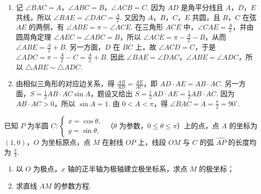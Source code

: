 \begin{solution}
\begin{enumerate}
\item 记 \(\angle BAC=A\)，\(\angle ABC=B\)，\(\angle ACB=C\). 因为 \(AD\) 是角平分线且 \(A\)，\(D\)，\(E\) 共线，所以 \(\angle BAE=\angle DAC=\frac{A}{2}\). 又因为 \(A\)，\(B\)，\(C\)，\(E\) 共圆，且 \(B\)，\(C\) 在弦 \(AE\) 的两侧，有 \(\angle ABE=\pi-\angle ACE\). 在三角形 \(ACE\) 中，\(\angle CAE=\frac{A}{2}\)，并由圆周角定理 \(\angle AEC=\angle ABC=B\)，所以 \(\angle ACE=\pi-\frac{A}{2}-B\)，从而 \(\angle ABE=\frac{A}{2}+B\). 另一方面，\(D\) 在 \(BC\) 上，故 \(\angle ACD=C\)，于是 \(\angle ADC=\pi-\frac{A}{2}-C=\frac{A}{2}+B\). 因此 \(\angle BAE=\angle DAC\)，\(\angle ABE=\angle ADC\)，所以 \(\triangle ABE\sim\triangle ADC\).
\item 由相似三角形的对应边关系，得 \(\frac{AB}{AD}=\frac{AE}{AC}\)，即 \(AD\cdot AE=AB\cdot AC\). 另一方面，\(S=\frac{1}{2}AB\cdot AC\sin A\)，题设又给出 \(S=\frac{1}{2}AD\cdot AE=\frac{1}{2}AB\cdot AC\). 因为 \(AB\cdot AC>0\)，所以 \(\sin A=1\). 由 \(0<A<\pi\)，得 \(\angle BAC=A=\frac{\pi}{2}=90^\circ\).
\end{enumerate}
\end{solution}

\begin{problem}
已知 \(P\) 为半圆 \(C:\begin{cases}
x=\cos\theta,\\
y=\sin\theta,
\end{cases}\) （\(\theta\) 为参数，\(0\leqslant\theta\leqslant\pi\)）上的点，点 \(A\) 的坐标为 \((1,0)\)，\(O\) 为坐标原点，点 \(M\) 在射线 \(OP\) 上，线段 \(OM\) 与 \(C\) 的弧 \(\widehat{AP}\) 的长度均为 \(\frac{\pi}{3}\).

\begin{enumerate}
\item 以 \(O\) 为极点，\(x\) 轴的正半轴为极轴建立极坐标系，求点 \(M\) 的极坐标；
\item 求直线 \(AM\) 的参数方程.
\end{enumerate}
\end{problem}

